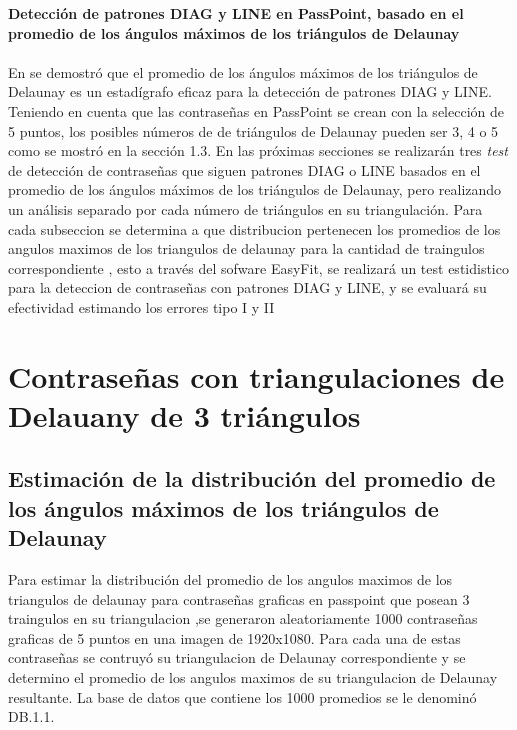 \documentclass[12pt]{report}
\begin{document}
\vspace{-2em} %

\noindent\textbf{\LARGE Detección de patrones DIAG y LINE en PassPoint, basado en el promedio de los ángulos máximos de los triángulos de Delaunay}\\
\vspace{2em}
\\	
En \cite{13} se demostró que el promedio de los ángulos máximos de los triángulos de Delaunay es un estadígrafo eficaz para la detección de patrones DIAG y LINE. Teniendo en cuenta que las contraseñas en PassPoint se crean con la selección de 5 puntos, los posibles números de  de triángulos de Delaunay pueden ser 3, 4 o 5 como se mostró en la sección 1.3. En las próximas secciones se realizarán tres \textit{test} de detección de contraseñas  que siguen patrones DIAG o LINE basados en el promedio de los ángulos  máximos de los triángulos de Delaunay, pero  realizando un análisis separado por cada número de triángulos en su triangulación.
Para  cada subseccion se determina a que distribucion pertenecen los promedios de los angulos maximos de los triangulos de delaunay para la cantidad de traingulos correspondiente , esto a través  del sofware EasyFit, se realizará un test estidistico para la deteccion de contraseñas con patrones DIAG y LINE, y se evaluará su efectividad estimando los errores tipo I y II 
\setcounter{section}{0}
\setcounter{figure}{2.0}
\section{Contraseñas con triangulaciones de Delauany de 3 triángulos }
\subsection{Estimación de la distribución del promedio de los ángulos máximos de los triángulos de Delaunay }
	 Para estimar la distribución del promedio de los angulos maximos de los triangulos de delaunay para contraseñas graficas en passpoint que posean 3 traingulos en su triangulacion ,se generaron aleatoriamente 1000 contraseñas graficas de 5 puntos en una imagen de 1920x1080. Para cada una de estas contraseñas se  contruyó  su triangulacion  de Delaunay correspondiente y se  determino el promedio  de los angulos maximos de su triangulacion de Delaunay resultante. La base de datos que contiene los 1000 promedios se le denominó DB.1.1.
	 
\end{document}
